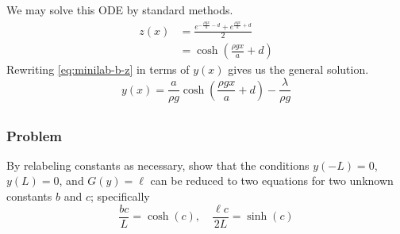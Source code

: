 \documentclass[12pt,twoside]{article}
\begin{document}
We may solve this ODE by standard methods.
\begin{equation}
  \label{eq:minilab-b-z}
  \begin{aligned}
    z(x) &= \frac{e^{-\frac{\rho g x}{a}-d} + e^{\frac{\rho g x}{a}+d}}{2} \\
    &= \cosh\left(\frac{\rho g x}{a} + d\right)
  \end{aligned}
\end{equation}
Rewriting \cref{eq:minilab-b-z} in terms of $y(x)$ gives us the general
solution.
\begin{equation*}
  \boxed{y(x) = \frac{a}{\rho g}\cosh\left(\frac{\rho g x}{a}+d\right) - \frac{\lambda}{\rho g}}
\end{equation*}

\subsection{}
\subsubsection*{Problem}
By relabeling constants as necessary, show that the conditions $y(-L)=0$,
$y(L)=0$, and $G(y)=\ell$ can be reduced to two equations for two unknown
constants $b$ and $c$; specifically
\begin{equation}
  \label{eq:minilab-b-problem}
  \frac{bc}{L}=\cosh(c),\quad \frac{\ell c}{2L}=\sinh(c)
\end{equation}
\end{document}
